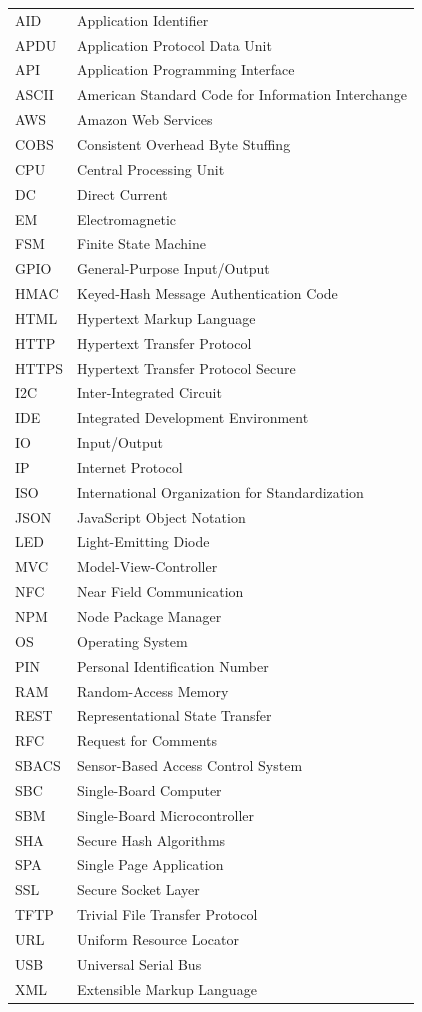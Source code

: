 \documentclass[12pt]{report}
\begin{document}
\begin{tabular}[t]{l@{\hspace*{2cm}}l}
    AID & Application Identifier \\
    APDU & Application Protocol Data Unit \\
    API & Application Programming Interface \\
	ASCII & American Standard Code for Information Interchange \\
	AWS & Amazon Web Services \\
    COBS & Consistent Overhead Byte Stuffing \\
    CPU & Central Processing Unit \\
	DC & Direct Current \\
	EM & Electromagnetic \\
	FSM & Finite State Machine \\
	GPIO & General-Purpose Input/Output \\
    HMAC & Keyed-Hash Message Authentication Code \\
    HTML & Hypertext Markup Language \\
    HTTP & Hypertext Transfer Protocol \\
	HTTPS & Hypertext Transfer Protocol Secure \\
    I2C & Inter-Integrated Circuit \\
	IDE & Integrated Development Environment \\
    IO & Input/Output \\
	IP & Internet Protocol \\
	ISO & International Organization for Standardization \\
    JSON & JavaScript Object Notation \\
    LED & Light-Emitting Diode \\
    MVC & Model-View-Controller \\
    NFC & Near Field Communication \\
	NPM & Node Package Manager \\
    OS & Operating System \\
	PIN & Personal Identification Number \\
	RAM & Random-Access Memory \\
	REST & Representational State Transfer \\
    RFC & Request for Comments \\
    SBACS & Sensor-Based Access Control System \\
	SBC & Single-Board Computer \\
	SBM & Single-Board Microcontroller \\
	SHA & Secure Hash Algorithms \\
	SPA & Single Page Application \\
	SSL & Secure Socket Layer \\
	TFTP & Trivial File Transfer Protocol \\
    URL & Uniform Resource Locator \\
	USB & Universal Serial Bus \\
	XML & Extensible Markup Language \\
\end{tabular}
\end{document}
